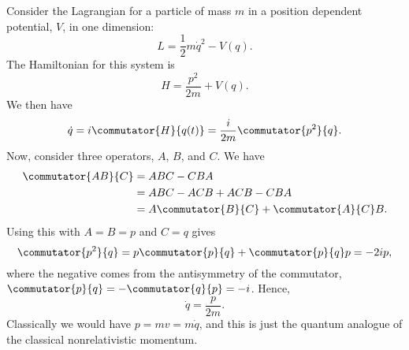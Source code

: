 \documentclass[fleqn]{NotesClass}
\begin{document}
    \begin{exm}{}{}
        Consider the Lagrangian for a particle of mass \(m\) in a position dependent potential, \(V\), in one dimension:
        \begin{equation}
            L = \frac{1}{2}m\dot{q}^2 - V(q).
        \end{equation}
        The Hamiltonian for this system is
        \begin{equation}
            H = \frac{p^2}{2m} + V(q).
        \end{equation}
        We then have
        \begin{equation}
            \dot{q} = i\commutator{H}{q(t)} = \frac{i}{2m}\commutator{p^2}{q}.
        \end{equation}
        Now, consider three operators, \(A\), \(B\), and \(C\).
        We have
        \begin{align}
            \commutator{AB}{C} &= ABC - CBA\\
            &= ABC - ACB + ACB - CBA\\
            &= A\commutator{B}{C} + \commutator{A}{C}B.
        \end{align}
        Using this with \(A = B = p\) and \(C = q\) gives
        \begin{equation}
            \commutator{p^2}{q} = p\commutator{p}{q} + \commutator{p}{q}p = -2ip,
        \end{equation}
        where the negative comes from the antisymmetry of the commutator, \(\commutator{p}{q} = -\commutator{q}{p} = -i\).
        Hence,
        \begin{equation}
            \dot{q} = \frac{p}{2m}.
        \end{equation}
        Classically we would have \(p = mv = m\dot{q}\), and this is just the quantum analogue of the classical nonrelativistic momentum.
        

\end{exm}
\end{document}
